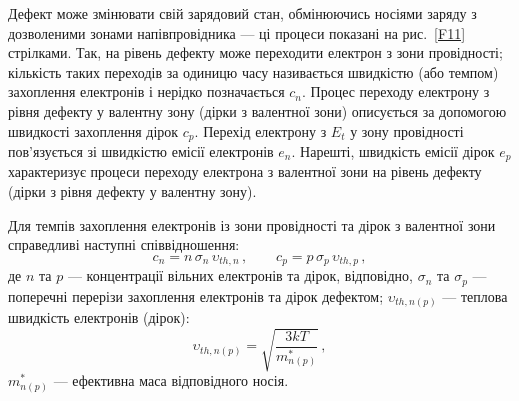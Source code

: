 Дефект може змінювати свій зарядовий стан, обмінюючись носіями заряду з дозволеними
зонами напівпровідника --- ці процеси показані на рис.~\ref{F11} стрілками.
Так, на рівень дефекту може переходити електрон з зони провідності;
кількість таких переходів за одиницю часу називається швидкістю (або темпом) захоплення електронів
і нерідко позначається $c_n$.
Процес переходу електрону з рівня дефекту у валентну зону (дірки з валентної зони)
описується за допомогою швидкості захоплення дірок $c_p$.
Перехід електрону з $E_t$ у зону провідності пов'язується зі швидкістю емісії електронів $e_n$.
Нарешті, швидкість емісії дірок $e_p$ характеризує процеси переходу
електрона з валентної зони на рівень дефекту (дірки з рівня дефекту у валентну зону).

Для темпів захоплення електронів із зони провідності та дірок з валентної зони
справедливі наступні співвідношення:
\begin{equation}
\label{cnp}
 c_n=n\,\sigma_n\,\upsilon_{th,n}\,, \qquad c_p=p\,\sigma_p\,\upsilon_{th,p}\,,
\end{equation}
де
$n$ та $p$ --- концентрації вільних електронів та дірок, відповідно,
$\sigma_n$ та $\sigma_p$ --- поперечні перерізи захоплення електронів та дірок
дефектом;
$\upsilon_{th,n(p)}$ --- теплова швидкість електронів (дірок):
\begin{equation}
\label{Vth}
 \upsilon_{th,n(p)}=\sqrt{\frac{3kT}{m_{n(p)}^*}}\,,
\end{equation}
$m_{n(p)}^*$ --- ефективна маса відповідного носія.

